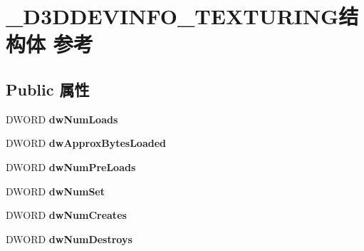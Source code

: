 \hypertarget{struct___d3_d_d_e_v_i_n_f_o___t_e_x_t_u_r_i_n_g}{}\section{\+\_\+\+D3\+D\+D\+E\+V\+I\+N\+F\+O\+\_\+\+T\+E\+X\+T\+U\+R\+I\+N\+G结构体 参考}
\label{struct___d3_d_d_e_v_i_n_f_o___t_e_x_t_u_r_i_n_g}
\subsection*{Public 属性}
\begin{DoxyCompactItemize}
\item 
\mbox{\label{struct___d3_d_d_e_v_i_n_f_o___t_e_x_t_u_r_i_n_g_a2f2545535385a3393078e7793d0fa3a9}} 
D\+W\+O\+RD {\bfseries dw\+Num\+Loads}
\item 
\mbox{\label{struct___d3_d_d_e_v_i_n_f_o___t_e_x_t_u_r_i_n_g_a696776448a6937ee882f404691908845}} 
D\+W\+O\+RD {\bfseries dw\+Approx\+Bytes\+Loaded}
\item 
\mbox{\label{struct___d3_d_d_e_v_i_n_f_o___t_e_x_t_u_r_i_n_g_a37ed94893d53d0333711cad916ce9b58}} 
D\+W\+O\+RD {\bfseries dw\+Num\+Pre\+Loads}
\item 
\mbox{\label{struct___d3_d_d_e_v_i_n_f_o___t_e_x_t_u_r_i_n_g_a680097cb8dc8fd3e2750883296b1fa96}} 
D\+W\+O\+RD {\bfseries dw\+Num\+Set}
\item 
\mbox{\label{struct___d3_d_d_e_v_i_n_f_o___t_e_x_t_u_r_i_n_g_aefd98f9bf25f999a955ab67f3270c12e}} 
D\+W\+O\+RD {\bfseries dw\+Num\+Creates}
\item 
\mbox{\label{struct___d3_d_d_e_v_i_n_f_o___t_e_x_t_u_r_i_n_g_ad668560936419b4a4d342f9a498da379}} 
D\+W\+O\+RD {\bfseries dw\+Num\+Destroys}
\item 
\mbox{\label{struct___d3_d_d_e_v_i_n_f_o___t_e_x_t_u_r_i_n_g_a33d1cbc15853452549e0fde27c619294}} 

\end{DoxyCompactItemize}
